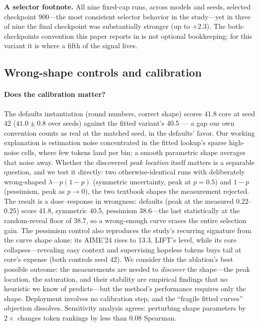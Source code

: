 \documentclass{article} %
\begin{document}
\textbf{A selector footnote.} All nine fixed-cap runs, across models and seeds, selected checkpoint 900---the most consistent selector behavior in the study---yet in three of nine the final checkpoint was substantially stronger (up to $+2.3$). The both-checkpoints convention this paper reports in is not optional bookkeeping; for this variant it is where a fifth of the signal lives.

\subsection*{Wrong-shape controls and calibration}
\paragraph{Does the calibration matter?} The defaults instantiation (round numbers, correct shape) scores 41.8 core at seed 42 ($41.0 \pm 0.8$ over seeds) against the fitted variant's 40.5 --- a gap our own convention counts as real at the matched seed, in the defaults' favor. Our working explanation is estimation noise concentrated in the fitted lookup's sparse high-noise cells, where few tokens land per bin; a smooth parametric shape averages that noise away. Whether the discovered \emph{peak location} itself matters is a separable question, and we test it directly: two otherwise-identical runs with deliberately wrong-shaped $\lambda$---$p(1{-}p)$ (symmetric uncertainty, peak at $p{=}0.5$) and $1{-}p$ (pessimism, peak as $p \to 0$), the two textbook shapes the measurement rejected. The result is a dose--response in wrongness: defaults (peak at the measured $0.22$--$0.25$) score 41.8, symmetric 40.5, pessimism 38.6---the last statistically at the random-reveal floor of 38.7, so a wrong-enough curve erases the entire selection gain. The pessimism control also reproduces the study's recurring signature from the curve shape alone: its AIME'24 rises to 13.3, LIFT's level, while its core collapses---revealing easy context and supervising hopeless tokens buys tail at core's expense (both controls seed 42). We consider this the ablation's best possible outcome: the measurements are needed to \emph{discover} the shape---the peak location, the saturation, and their stability are empirical findings that no heuristic we know of predicts---but the method's performance requires only the shape. Deployment involves no calibration step, and the ``fragile fitted curves'' objection dissolves. Sensitivity analysis agrees: perturbing shape parameters by $2\times$ changes token rankings by less than $0.08$ Spearman.
\end{document}
